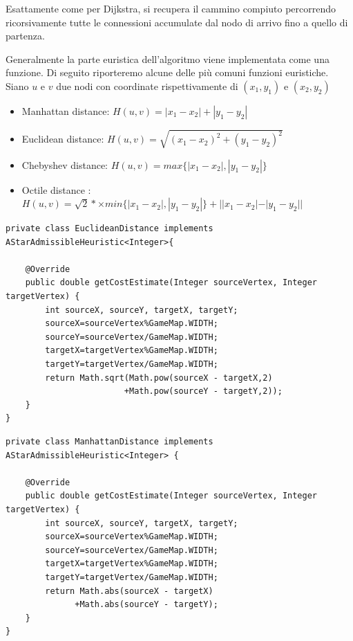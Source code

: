 \documentclass[11pt]{book}
\begin{document}
\par{Esattamente come per Dijkstra, si recupera il cammino compiuto percorrendo ricorsivamente tutte le connessioni accumulate dal nodo di arrivo fino a quello di partenza.}
\par{Generalmente la parte euristica dell'algoritmo viene implementata come una funzione.
Di seguito riporteremo alcune delle pi\`u comuni funzioni euristiche.
 Siano $u$ e $v$ due nodi con coordinate rispettivamente di $(x_1, y_1)$ e $(x_2, y_2)$ }
\begin{itemize}
\item Manhattan distance: $H(u,v) = |x_1 - x_2| + |y_1 - y_2|$
\item Euclidean distance: $H(u,v) = \sqrt{(x_1 - x_2)^2 + (y_1 - y_2)^2}$
\item Chebyshev distance: $H(u,v) = max\{|x_1 - x_2|, |y_1 - y_2|\} $
\item Octile distance : $H(u,v) = \sqrt{2} *× min\{|x_1 - x_2 |, |y_1 - y_2 |\} + ||x_1 - x_2 | - |y_1 - y_2 || $
\end{itemize}
\iffalse
{}
\lstset{style=customjava, label=lstEuclide caption=euclidean distance}
\begin{lstlisting}
private class EuclideanDistance implements AStarAdmissibleHeuristic<Integer>{

    @Override
    public double getCostEstimate(Integer sourceVertex, Integer targetVertex) {
        int sourceX, sourceY, targetX, targetY;
        sourceX=sourceVertex%GameMap.WIDTH;
        sourceY=sourceVertex/GameMap.WIDTH;
        targetX=targetVertex%GameMap.WIDTH;
        targetY=targetVertex/GameMap.WIDTH;
        return Math.sqrt(Math.pow(sourceX - targetX,2)
                        +Math.pow(sourceY - targetY,2));
    }
}
\end{lstlisting}
\lstset{style=customjava,label=lstManhattan, caption=Manhattan distance}
\begin{lstlisting}
private class ManhattanDistance implements AStarAdmissibleHeuristic<Integer> {

    @Override
    public double getCostEstimate(Integer sourceVertex, Integer targetVertex) {
        int sourceX, sourceY, targetX, targetY;
        sourceX=sourceVertex%GameMap.WIDTH;
        sourceY=sourceVertex/GameMap.WIDTH;
        targetX=targetVertex%GameMap.WIDTH;
        targetY=targetVertex/GameMap.WIDTH;
        return Math.abs(sourceX - targetX)
              +Math.abs(sourceY - targetY);
    }
}
\end{lstlisting}
\end{document}
